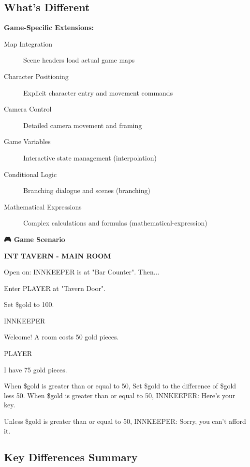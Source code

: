 \documentclass[11pt,letterpaper,oldstylefigures]{memoir}
\newcommand{\slugline}[1]{\nobreak\textbf{\MakeUppercase{#1}}\par\nobreak\vspace{1\baselineskip}}
\newcommand{\speaker}[1]{\nobreak\hspace*{0.333\textwidth}\MakeUppercase{#1}\par\nobreak\vspace{0.5\baselineskip}}
\newcommand{\dialogue}[1]{\nobreak\hspace*{0.25\textwidth}\begin{minipage}{0.5\textwidth}#1\end{minipage}\par\vspace{1\baselineskip}}
\newcommand{\stagedir}[1]{#1\par\vspace{1\baselineskip}}
\newenvironment{FountainExample}
  {\begingroup
  \ttfamily\small
   \setlength{\parindent}{0pt}
  \setlength{\parskip}{0.5em}
  \allowdisplaybreaks
  \setlength{\displaywidowpenalty}{0}
  \setlength{\widowpenalty}{0}
  \setlength{\clubpenalty}{0}
  \setlength{\interlinepenalty}{0}
}
  {\endgroup}
\newenvironment{GameScenario}
{\begingroup
\small
\setlength{\parindent}{0pt}
\setlength{\parskip}{0.5em}
\allowdisplaybreaks
\setlength{\displaywidowpenalty}{0}
\setlength{\widowpenalty}{0}
\setlength{\clubpenalty}{0}
\setlength{\interlinepenalty}{0}
\begin{tcolorbox}[
    colback=orange!5,
    colframe=orange!75!black,
    boxrule=0.5pt,
    arc=2pt,
    left=0.5em,
    right=0.5em,
    top=0.25em,
    bottom=0.25em
]
\textbf{🎮 Game Scenario}
\end{tcolorbox}\par
}
{\endgroup}
\begin{document}
\subsection{What's Different}

\textbf{Game-Specific Extensions:}
\begin{description}
\item[Map Integration] Scene headers load actual game maps
\item[Character Positioning] Explicit character entry and movement commands
\item[Camera Control] Detailed camera movement and framing
\item[Game Variables] Interactive state management (\gls{interpolation})
\item[Conditional Logic] Branching dialogue and scenes (\gls{branching})
\item[Mathematical Expressions] Complex calculations and formulas (\gls{mathematical-expression})
\end{description}

\begin{GameScenario}
\begin{FountainExample}
\slugline{INT TAVERN - MAIN ROOM}

\stagedir{Open on: INNKEEPER is at "Bar Counter". Then...}
\stagedir{Enter PLAYER at "Tavern Door".}

\stagedir{Set \$gold to 100.}

\speaker{INNKEEPER}
\dialogue{Welcome! A room costs 50 gold pieces.}

\speaker{PLAYER}
\dialogue{I have 75 gold pieces.}
\stagedir{When \$gold is greater than or equal to 50, Set \$gold to the difference of \$gold less 50. When \$gold is greater than or equal to 50, INNKEEPER: Here's your key.}
\stagedir{Unless \$gold is greater than or equal to 50, INNKEEPER: Sorry, you can't afford it.}
\end{FountainExample}
\end{GameScenario}

\subsection{Key Differences Summary}
\end{document}
